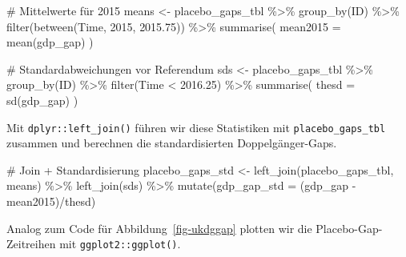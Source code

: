 \documentclass[
  a4paper,
  DIV=11,
  oneside]{scrreprt}
\newenvironment{Shaded}{\begin{snugshade}}{\end{snugshade}}
\newcommand{\AttributeTok}[1]{\textcolor[rgb]{0.40,0.45,0.13}{#1}}
\newcommand{\CommentTok}[1]{\textcolor[rgb]{0.37,0.37,0.37}{#1}}
\newcommand{\DecValTok}[1]{\textcolor[rgb]{0.68,0.00,0.00}{#1}}
\newcommand{\FloatTok}[1]{\textcolor[rgb]{0.68,0.00,0.00}{#1}}
\newcommand{\FunctionTok}[1]{\textcolor[rgb]{0.28,0.35,0.67}{#1}}
\newcommand{\NormalTok}[1]{\textcolor[rgb]{0.00,0.23,0.31}{#1}}
\newcommand{\OtherTok}[1]{\textcolor[rgb]{0.00,0.23,0.31}{#1}}
\newcommand{\SpecialCharTok}[1]{\textcolor[rgb]{0.37,0.37,0.37}{#1}}
\begin{document}
\begin{Shaded}
\begin{Highlighting}[]
\CommentTok{\# Mittelwerte für 2015}
\NormalTok{means }\OtherTok{\textless{}{-}}\NormalTok{ placebo\_gaps\_tbl }\SpecialCharTok{\%\textgreater{}\%} 
  \FunctionTok{group\_by}\NormalTok{(ID) }\SpecialCharTok{\%\textgreater{}\%} 
  \FunctionTok{filter}\NormalTok{(}\FunctionTok{between}\NormalTok{(Time, }\DecValTok{2015}\NormalTok{, }\FloatTok{2015.75}\NormalTok{)) }\SpecialCharTok{\%\textgreater{}\%} 
  \FunctionTok{summarise}\NormalTok{(}
    \AttributeTok{mean2015 =} \FunctionTok{mean}\NormalTok{(gdp\_gap)}
\NormalTok{  )}

\CommentTok{\# Standardabweichungen vor Referendum}
\NormalTok{sds }\OtherTok{\textless{}{-}}\NormalTok{ placebo\_gaps\_tbl }\SpecialCharTok{\%\textgreater{}\%} 
  \FunctionTok{group\_by}\NormalTok{(ID) }\SpecialCharTok{\%\textgreater{}\%} 
  \FunctionTok{filter}\NormalTok{(Time }\SpecialCharTok{\textless{}} \FloatTok{2016.25}\NormalTok{) }\SpecialCharTok{\%\textgreater{}\%} 
  \FunctionTok{summarise}\NormalTok{(}
    \AttributeTok{thesd =} \FunctionTok{sd}\NormalTok{(gdp\_gap)}
\NormalTok{  )}
\end{Highlighting}
\end{Shaded}

Mit \texttt{dplyr::left\_join()} führen wir diese Statistiken mit
\texttt{placebo\_gaps\_tbl} zusammen und berechnen die standardisierten
Doppelgänger-Gaps.

\begin{Shaded}
\begin{Highlighting}[]
\CommentTok{\# Join + Standardisierung}
\NormalTok{placebo\_gaps\_std }\OtherTok{\textless{}{-}} 
  \FunctionTok{left\_join}\NormalTok{(placebo\_gaps\_tbl, means) }\SpecialCharTok{\%\textgreater{}\%} 
  \FunctionTok{left\_join}\NormalTok{(sds) }\SpecialCharTok{\%\textgreater{}\%}
  \FunctionTok{mutate}\NormalTok{(}\AttributeTok{gdp\_gap\_std =}\NormalTok{ (gdp\_gap }\SpecialCharTok{{-}}\NormalTok{ mean2015)}\SpecialCharTok{/}\NormalTok{thesd)}
\end{Highlighting}
\end{Shaded}

Analog zum Code für Abbildung~\ref{fig-ukdggap} plotten wir die
Placebo-Gap-Zeitreihen mit \texttt{ggplot2::ggplot()}.
\end{document}
